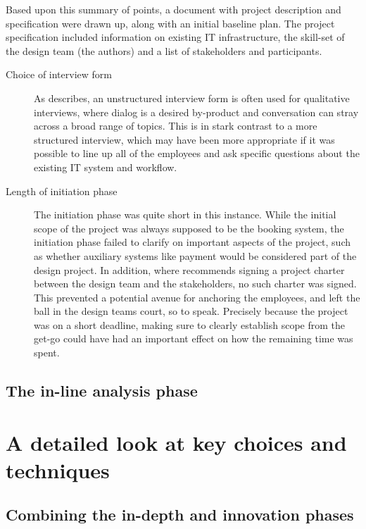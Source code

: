 Based upon this summary of points, a document with project description and
specification were drawn up, along with an initial baseline plan. The project
specification included information on existing IT infrastructure, the skill-set
of the design team (the authors) and a list of stakeholders and participants.

\begin{description}
    \item [Choice of interview form] As \cite[p.228]{bodker2004participatory} describes,
        an unstructured interview form is often used for qualitative interviews,
        where dialog is a desired by-product and conversation can stray across a
        broad range of topics. This is in stark contrast to a more structured
        interview, which may have been more appropriate if it was possible to line 
        up all of the employees and ask specific questions about the existing IT
        system and workflow.

    \item [Length of initiation phase] The initiation phase was quite short in this instance.
        While the initial scope of the project was always supposed to be the
        booking system, the initiation phase failed to clarify on important
        aspects of the project, such as whether auxiliary systems like payment 
        would be considered part of the design project. In addition, where
        \cite{bodker2004participatory} recommends signing a project charter
        between the design team and the stakeholders, no such charter was
        signed. This prevented a potential avenue for anchoring the employees,
        and left the ball in the design teams court, so to speak. Precisely
        because the project was on a short deadline, making sure to clearly
        establish scope from the get-go could have had an important effect on
        how the remaining time was spent.
\end{description}

\subsection{The in-line analysis phase}


\section{A detailed look at key choices and techniques} \label{sec:detailed}
\subsection{Combining the in-depth and innovation phases}

